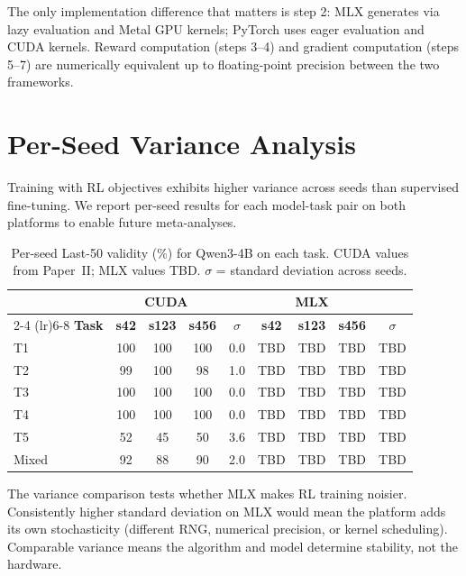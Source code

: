\documentclass[11pt]{article}
\begin{document}
The only implementation difference that matters is step 2: MLX generates via lazy evaluation and Metal GPU kernels; PyTorch uses eager evaluation and CUDA kernels.  Reward computation (steps 3--4) and gradient computation (steps 5--7) are numerically equivalent up to floating-point precision between the two frameworks.


\section{Per-Seed Variance Analysis}
\label{app:variance}

Training with RL objectives exhibits higher variance across seeds than supervised fine-tuning.  We report per-seed results for each model-task pair on both platforms to enable future meta-analyses.

\begin{table}[h]
\centering
\caption{Per-seed Last-50 validity (\%) for Qwen3-4B on each task.  CUDA values from Paper~II; MLX values TBD. $\sigma$ = standard deviation across seeds.}
\label{tab:per-seed-qwen}
\small
\begin{tabular}{l ccc c ccc c}
\toprule
& \multicolumn{3}{c}{\textbf{CUDA}} & & \multicolumn{3}{c}{\textbf{MLX}} & \\
\cmidrule(lr){2-4} \cmidrule(lr){6-8}
\textbf{Task} & \textbf{s42} & \textbf{s123} & \textbf{s456} & $\sigma$ & \textbf{s42} & \textbf{s123} & \textbf{s456} & $\sigma$ \\
\midrule
T1 & 100 & 100 & 100 & 0.0 & TBD & TBD & TBD & TBD \\
T2 & 99 & 100 & 98 & 1.0 & TBD & TBD & TBD & TBD \\
T3 & 100 & 100 & 100 & 0.0 & TBD & TBD & TBD & TBD \\
T4 & 100 & 100 & 100 & 0.0 & TBD & TBD & TBD & TBD \\
T5 & 52 & 45 & 50 & 3.6 & TBD & TBD & TBD & TBD \\
Mixed & 92 & 88 & 90 & 2.0 & TBD & TBD & TBD & TBD \\
\bottomrule
\end{tabular}
\end{table}

The variance comparison tests whether MLX makes RL training noisier.  Consistently higher standard deviation on MLX would mean the platform adds its own stochasticity (different RNG, numerical precision, or kernel scheduling).  Comparable variance means the algorithm and model determine stability, not the hardware.
\end{document}
